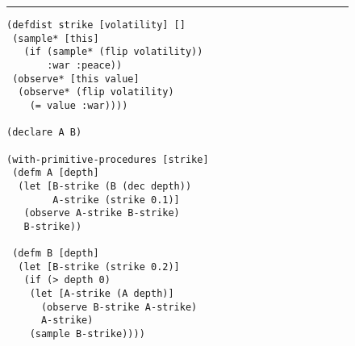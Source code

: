 \begin{figure}[p]
		\centering	
		\vspace{-20pt}		
\rule{\linewidth}{0.4pt}
\vspace{-28pt}		
		\begin{lstlisting}[basicstyle=\ttfamily\footnotesize,multicols=2,frame=none]
(defdist strike [volatility] []
 (sample* [this] 
   (if (sample* (flip volatility)) 
       :war :peace))
 (observe* [this value] 
  (observe* (flip volatility) 
    (= value :war))))
  
(declare A B)

(with-primitive-procedures [strike]
 (defm A [depth]
  (let [B-strike (B (dec depth))
        A-strike (strike 0.1)]
   (observe A-strike B-strike)
   B-strike))
   
 (defm B [depth]
  (let [B-strike (strike 0.2)]
   (if (> depth 0)
    (let [A-strike (A depth)]
      (observe B-strike A-strike)
      A-strike)
    (sample B-strike))))


\end{lstlisting}
\end{figure}
